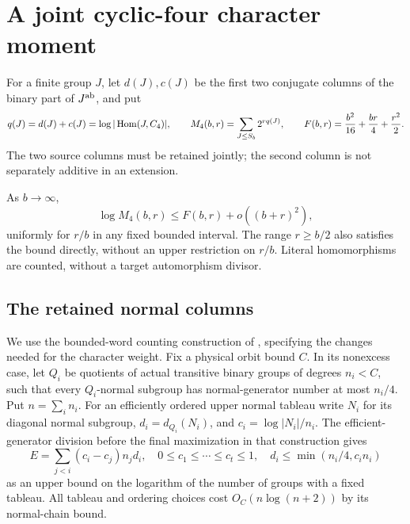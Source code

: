 \section{A joint cyclic-four character moment}\label{sec:cyclic-moment}
For a finite group $J$, let $d(J),c(J)$ be the first two conjugate
columns of the binary part of $J^{\rm ab}$, and put
\[
 q(J)=d(J)+c(J)=\log|\operatorname{Hom}(J,C_4)|,\qquad
 M_4(b,r)=\sum_{J\leq S_b}2^{rq(J)},\qquad
 F(b,r)=\frac{b^2}{16}+\frac{br}{4}+\frac{r^2}{2}.
\]
The two source columns must be retained jointly; the second column
is not separately additive in an extension.

\begin{theorem}\label{thm:C4-moment}
As $b\to\infty$,
\[
 \log M_4(b,r)\leq F(b,r)+o((b+r)^2),
\]
uniformly for $r/b$ in any fixed bounded interval. The range $r\geq b/2$
also satisfies the bound directly, without an upper restriction on $r/b$.
Literal homomorphisms are counted, without a target automorphism divisor.
\end{theorem}

\subsection{The retained normal columns}
We use the bounded-word counting construction of
\cite[Sections 3--5 and Proposition 7.4]{RoneyDougalTracey2025}, specifying
the changes needed for the character weight. Fix a physical orbit bound
$C$. In its nonexcess case, let $Q_i$ be quotients of actual transitive
binary groups of degrees $n_i<C$, such that every $Q_i$-normal subgroup
has normal-generator number at most $n_i/4$. Put $n=\sum_i n_i$.
For an efficiently ordered upper normal tableau write
$N_i$ for its diagonal normal subgroup,
$d_i=d_{Q_i}(N_i)$, and $c_i=\log|N_i|/n_i$. The efficient-generator
division before the final maximization in that construction gives
\begin{equation}\label{eq:tableau-input}
 E=\sum_{j<i}(c_i-c_j)n_jd_i,
 \quad 0\leq c_1\leq\cdots\leq c_t\leq1,
 \quad d_i\leq\min(n_i/4,c_in_i)
\end{equation}
as an upper bound on the logarithm of the number of groups with a
fixed tableau. All tableau and ordering choices cost
$O_C(n\log(n+2))$ by its normal-chain bound.

